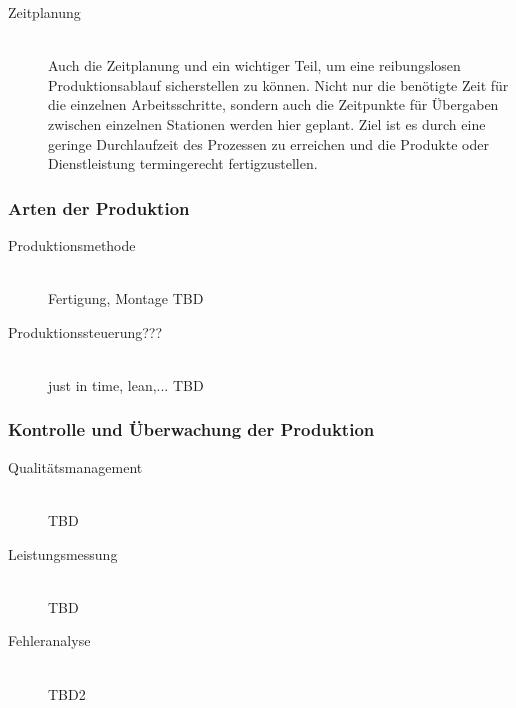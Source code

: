 \documentclass[a4paper,12pt, german]{report}
\begin{document}
\begin{description}
  \item[Zeitplanung]\hfill \\ 
  Auch die Zeitplanung und ein wichtiger Teil, um eine reibungslosen Produktionsablauf sicherstellen zu können. Nicht nur die benötigte Zeit für die einzelnen Arbeitsschritte, sondern auch die Zeitpunkte für Übergaben zwischen einzelnen Stationen werden hier geplant. Ziel ist es durch eine geringe Durchlaufzeit des Prozessen zu erreichen und die Produkte oder Dienstleistung termingerecht fertigzustellen.
  \end{description}


\subsubsection{Arten der Produktion}

\begin{description}
  \item[Produktionsmethode]\hfill \\
  Fertigung, Montage TBD

  \item[Produktionssteuerung???]\hfill \\ 
  just in time, lean,... TBD
  \end{description}

\subsubsection{Kontrolle und Überwachung der Produktion}

\begin{description}
  \item[Qualitätsmanagement]\hfill \\
  TBD
  \item[Leistungsmessung]\hfill \\ 
  TBD
  \item[Fehleranalyse]\hfill \\ 
  TBD2
  \end{description}



\end{document}
